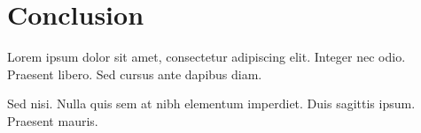 \section{Conclusion}

Lorem ipsum dolor sit amet, consectetur adipiscing elit. Integer nec odio. Praesent libero. Sed cursus ante dapibus diam.

Sed nisi. Nulla quis sem at nibh elementum imperdiet. Duis sagittis ipsum. Praesent mauris.
